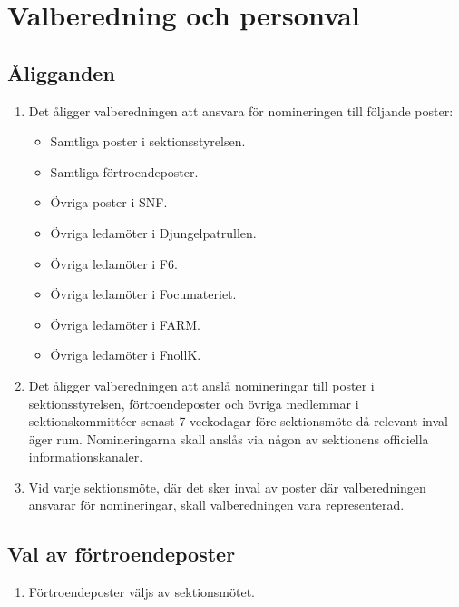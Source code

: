 \documentclass[11pt,a4paper]{article}
\begin{document}
\newpage

\section{Valberedning och personval}

\subsection{Åligganden}

\begin{enumerate}[\thesubsection .1]

  \item Det åligger valberedningen att ansvara för nomineringen till
  följande poster:
    \begin{itemize}
      \item Samtliga poster i sektionsstyrelsen.
      \item Samtliga förtroendeposter.
      \item Övriga poster i SNF.
      \item Övriga ledamöter i Djungelpatrullen.
      \item Övriga ledamöter i F6.
      \item Övriga ledamöter i Focumateriet.
        \item Övriga ledamöter i FARM.
          \item Övriga ledamöter i FnollK. 
        
    \end{itemize}
  \item Det åligger valberedningen att anslå nomineringar till poster i sektionsstyrelsen, förtroendeposter
och övriga medlemmar i sektionskommittéer senast 7 veckodagar före sektionsmöte då relevant inval
äger rum. Nomineringarna skall anslås via någon av sektionens officiella informationskanaler.

\item  Vid varje sektionsmöte, där det sker inval av poster där valberedningen ansvarar för nomineringar, skall valberedningen vara representerad.

\end{enumerate}

\subsection{Val av förtroendeposter}
	\begin{enumerate}[\thesubsection .1]
	\item Förtroendeposter väljs av sektionsmötet.
	\end{enumerate}
\end{document}
